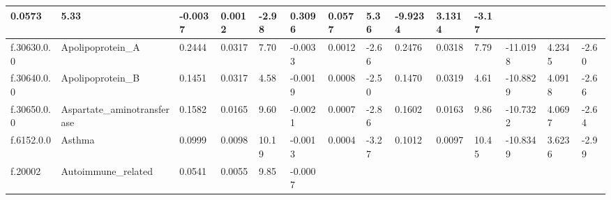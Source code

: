 \begin{longtable}{llllllllllllll}
  \multicolumn{1}{l|}{0.0573} &
  \multicolumn{1}{l|}{5.33} &
  \multicolumn{1}{l|}{-0.0037} &
  \multicolumn{1}{l|}{0.0012} &
  \multicolumn{1}{l|}{-2.98} &
  \multicolumn{1}{l|}{0.3096} &
  \multicolumn{1}{l|}{0.0577} &
  \multicolumn{1}{l|}{5.36} &
  \multicolumn{1}{l|}{-9.9234} &
  \multicolumn{1}{l|}{3.1314} &
  \multicolumn{1}{l|}{-3.17} \\ \hline
\multicolumn{1}{|l|}{f.30630.0.0} &
  \multicolumn{1}{l|}{Apolipoprotein\_A} &
  \multicolumn{1}{l|}{0.2444} &
  \multicolumn{1}{l|}{0.0317} &
  \multicolumn{1}{l|}{7.70} &
  \multicolumn{1}{l|}{-0.0033} &
  \multicolumn{1}{l|}{0.0012} &
  \multicolumn{1}{l|}{-2.66} &
  \multicolumn{1}{l|}{0.2476} &
  \multicolumn{1}{l|}{0.0318} &
  \multicolumn{1}{l|}{7.79} &
  \multicolumn{1}{l|}{-11.0198} &
  \multicolumn{1}{l|}{4.2345} &
  \multicolumn{1}{l|}{-2.60} \\ \hline
\multicolumn{1}{|l|}{f.30640.0.0} &
  \multicolumn{1}{l|}{Apolipoprotein\_B} &
  \multicolumn{1}{l|}{0.1451} &
  \multicolumn{1}{l|}{0.0317} &
  \multicolumn{1}{l|}{4.58} &
  \multicolumn{1}{l|}{-0.0019} &
  \multicolumn{1}{l|}{0.0008} &
  \multicolumn{1}{l|}{-2.50} &
  \multicolumn{1}{l|}{0.1470} &
  \multicolumn{1}{l|}{0.0319} &
  \multicolumn{1}{l|}{4.61} &
  \multicolumn{1}{l|}{-10.8829} &
  \multicolumn{1}{l|}{4.0918} &
  \multicolumn{1}{l|}{-2.66} \\ \hline
\multicolumn{1}{|l|}{f.30650.0.0} &
  \multicolumn{1}{l|}{Aspartate\_aminotransferase} &
  \multicolumn{1}{l|}{0.1582} &
  \multicolumn{1}{l|}{0.0165} &
  \multicolumn{1}{l|}{9.60} &
  \multicolumn{1}{l|}{-0.0021} &
  \multicolumn{1}{l|}{0.0007} &
  \multicolumn{1}{l|}{-2.86} &
  \multicolumn{1}{l|}{0.1602} &
  \multicolumn{1}{l|}{0.0163} &
  \multicolumn{1}{l|}{9.86} &
  \multicolumn{1}{l|}{-10.7322} &
  \multicolumn{1}{l|}{4.0697} &
  \multicolumn{1}{l|}{-2.64} \\ \hline
\multicolumn{1}{|l|}{f.6152.0.0} &
  \multicolumn{1}{l|}{Asthma} &
  \multicolumn{1}{l|}{0.0999} &
  \multicolumn{1}{l|}{0.0098} &
  \multicolumn{1}{l|}{10.19} &
  \multicolumn{1}{l|}{-0.0013} &
  \multicolumn{1}{l|}{0.0004} &
  \multicolumn{1}{l|}{-3.27} &
  \multicolumn{1}{l|}{0.1012} &
  \multicolumn{1}{l|}{0.0097} &
  \multicolumn{1}{l|}{10.45} &
  \multicolumn{1}{l|}{-10.8349} &
  \multicolumn{1}{l|}{3.6236} &
  \multicolumn{1}{l|}{-2.99} \\ \hline
\multicolumn{1}{|l|}{f.20002} &
  \multicolumn{1}{l|}{Autoimmune\_related} &
  \multicolumn{1}{l|}{0.0541} &
  \multicolumn{1}{l|}{0.0055} &
  \multicolumn{1}{l|}{9.85} &
  \multicolumn{1}{l|}{-0.0007} &

\end{longtable}

